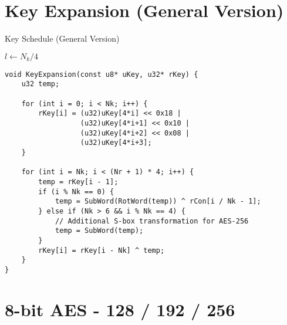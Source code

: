 \newpage
\section{Key Expansion (General Version)}
\begin{algorithm}[H]
	\caption{Key Schedule (General Version)}
	
	\BlankLine
	$l\gets N_k/4$
\end{algorithm}
\begin{lstlisting}[style=C, caption={Key Expansion (General ver.)},captionpos=t]
void KeyExpansion(const u8* uKey, u32* rKey) {
	u32 temp;
	
	for (int i = 0; i < Nk; i++) {
		rKey[i] = (u32)uKey[4*i] << 0x18 | 
				  (u32)uKey[4*i+1] << 0x10 | 
				  (u32)uKey[4*i+2] << 0x08 | 
				  (u32)uKey[4*i+3];
	}
	
	for (int i = Nk; i < (Nr + 1) * 4; i++) {
		temp = rKey[i - 1];
		if (i % Nk == 0) {
			temp = SubWord(RotWord(temp)) ^ rCon[i / Nk - 1];
		} else if (Nk > 6 && i % Nk == 4) {
			// Additional S-box transformation for AES-256
			temp = SubWord(temp);
		}
		rKey[i] = rKey[i - Nk] ^ temp;
	}
}
\end{lstlisting}

\newpage
\section{8-bit AES - 128 / 192 / 256}

